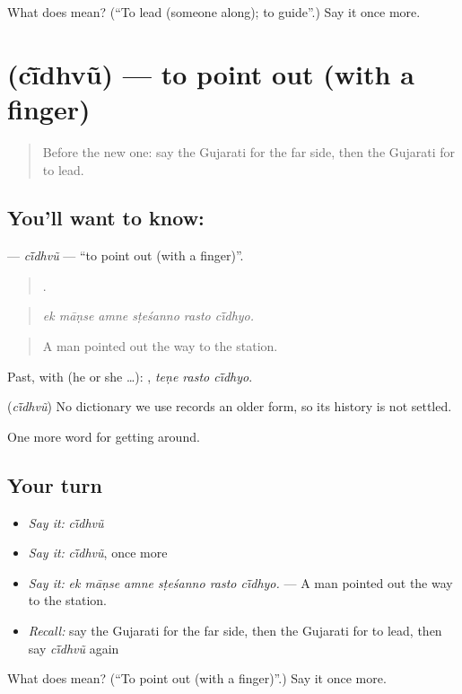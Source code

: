 \begin{tcolorbox}[breakable,colback=teal!4,colframe=teal!35!black,title={Before you move on}]
What does  mean? (\textquotedblleft{}To lead (someone along); to guide\textquotedblright{}.) Say it once more.
\end{tcolorbox}
\section[\texorpdfstring{\gu{ચીંધવું} (cī̃dhvũ)}{ચીંધવું (cī̃dhvũ)}]{ (cī̃dhvũ) — to point out (with a finger)}

\label{lesson:GU-C413-cidhvu}



\begin{quote}
Before the new one: say the Gujarati for the far side, then the Gujarati for to lead.
\end{quote}

\subsection*{You'll want to know: }
\textbf{} — \emph{cī̃dhvũ} — \textquotedblleft{}to point out (with a finger)\textquotedblright{}.

\begin{quote}
     .
\end{quote}

\begin{quote}
\emph{ek māṇse amne sṭeśanno rasto cī̃dhyo.}
\end{quote}

\begin{quote}
A man pointed out the way to the station.
\end{quote}

Past, with  (he or she …):   , \emph{teṇe rasto cī̃dhyo}.

\begin{cousinweb}
\textbf{} (\emph{cī̃dhvũ}) No dictionary we use records an older form, so its history is not settled.
\end{cousinweb}

\begin{grammarlens}[title={What you've built}]
One more word for getting around.
\end{grammarlens}

\subsection*{Your turn}
\begin{itemize}
\raggedright
  \item \emph{Say it:} \emph{cī̃dhvũ}
  \item \emph{Say it:} \emph{cī̃dhvũ}, once more
  \item \emph{Say it:} \emph{ek māṇse amne sṭeśanno rasto cī̃dhyo.} — A man pointed out the way to the station.
  \item \emph{Recall:} say the Gujarati for the far side, then the Gujarati for to lead, then say \emph{cī̃dhvũ} again
\end{itemize}

\begin{tcolorbox}[breakable,colback=teal!4,colframe=teal!35!black,title={Before you move on}]
What does  mean? (\textquotedblleft{}To point out (with a finger)\textquotedblright{}.) Say it once more.
\end{tcolorbox}

